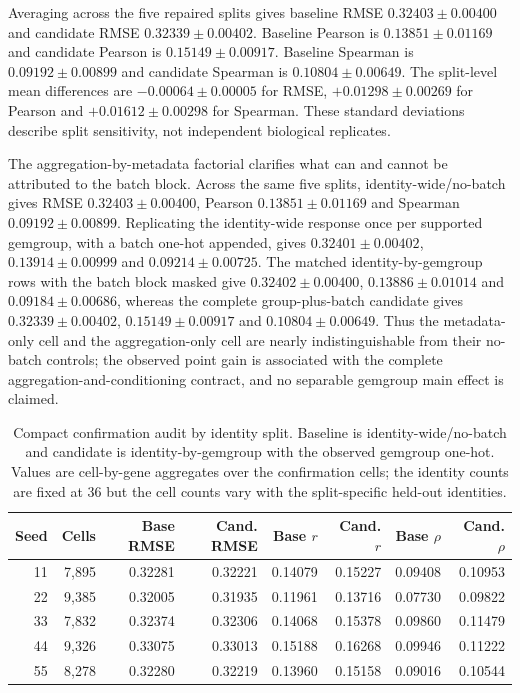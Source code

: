 \documentclass[10pt]{article}
\begin{document}
Averaging across the five repaired splits gives baseline RMSE $0.32403\pm0.00400$ and candidate RMSE $0.32339\pm0.00402$. Baseline Pearson is $0.13851\pm0.01169$ and candidate Pearson is $0.15149\pm0.00917$. Baseline Spearman is $0.09192\pm0.00899$ and candidate Spearman is $0.10804\pm0.00649$. The split-level mean differences are $-0.00064\pm0.00005$ for RMSE, $+0.01298\pm0.00269$ for Pearson and $+0.01612\pm0.00298$ for Spearman. These standard deviations describe split sensitivity, not independent biological replicates.

The aggregation-by-metadata factorial clarifies what can and cannot be attributed to the batch block. Across the same five splits, identity-wide/no-batch gives RMSE $0.32403\pm0.00400$, Pearson $0.13851\pm0.01169$ and Spearman $0.09192\pm0.00899$. Replicating the identity-wide response once per supported gemgroup, with a batch one-hot appended, gives $0.32401\pm0.00402$, $0.13914\pm0.00999$ and $0.09214\pm0.00725$. The matched identity-by-gemgroup rows with the batch block masked give $0.32402\pm0.00400$, $0.13886\pm0.01014$ and $0.09184\pm0.00686$, whereas the complete group-plus-batch candidate gives $0.32339\pm0.00402$, $0.15149\pm0.00917$ and $0.10804\pm0.00649$. Thus the metadata-only cell and the aggregation-only cell are nearly indistinguishable from their no-batch controls; the observed point gain is associated with the complete aggregation-and-conditioning contract, and no separable gemgroup main effect is claimed.

\begin{table}[t]
\centering
\scriptsize
\caption{Compact confirmation audit by identity split. Baseline is identity-wide/no-batch and candidate is identity-by-gemgroup with the observed gemgroup one-hot. Values are cell-by-gene aggregates over the confirmation cells; the identity counts are fixed at 36 but the cell counts vary with the split-specific held-out identities.}
\begin{tabular}{r r r r r r r r}
\toprule
Seed & Cells & Base RMSE & Cand. RMSE & Base $r$ & Cand. $r$ & Base $\rho$ & Cand. $\rho$\\
\midrule
11 & 7,895 & 0.32281 & 0.32221 & 0.14079 & 0.15227 & 0.09408 & 0.10953\\
22 & 9,385 & 0.32005 & 0.31935 & 0.11961 & 0.13716 & 0.07730 & 0.09822\\
33 & 7,832 & 0.32374 & 0.32306 & 0.14068 & 0.15378 & 0.09860 & 0.11479\\
44 & 9,326 & 0.33075 & 0.33013 & 0.15188 & 0.16268 & 0.09946 & 0.11222\\
55 & 8,278 & 0.32280 & 0.32219 & 0.13960 & 0.15158 & 0.09016 & 0.10544\\
\bottomrule
\end{tabular}
\label{tab:per_seed_confirmation}
\end{table}
\end{document}
